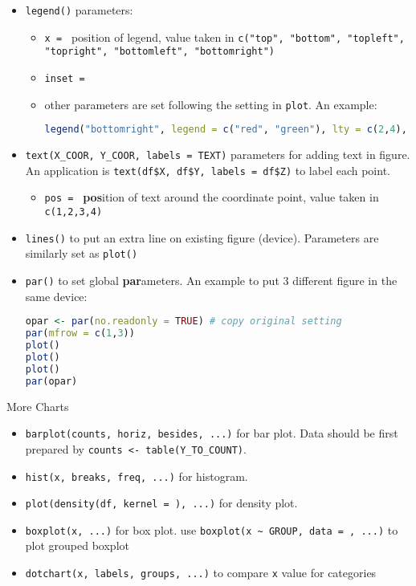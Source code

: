 \begin{itemize}[topsep=2pt,itemsep=0pt]
        

    \item \lstinline|legend()| parameters:
    \begin{itemize}[topsep=2pt,itemsep=0pt]
        \item \lstinline|x = | position of legend, value taken in \lstinline|c("top", "bottom", "topleft", "topright", "bottomleft", "bottomright")|
        \item \lstinline|inset = |
        \item other parameters are set following the setting in \lstinline|plot|. An example:
\begin{lstlisting}[language=R]
legend("bottomright", legend = c("red", "green"), lty = c(2,4), lwd = 3, col = c("red", "green"))
\end{lstlisting}

    \end{itemize}

    \item \lstinline|text(X_COOR, Y_COOR, labels = TEXT)| parameters for adding text in figure. An application is \lstinline|text(df$X, df$Y, labels = df$Z)| to label each point.
    \begin{itemize}[topsep=2pt,itemsep=0pt]
        \item \lstinline|pos = | \textbf{pos}ition of text around the coordinate point, value taken in \lstinline|c(1,2,3,4)| 
    \end{itemize}
    
    \item \lstinline|lines()| to put an extra line on existing figure (device). Parameters are similarly set as \lstinline|plot()|
    
    \item \lstinline|par()| to set global \textbf{par}ameters. An example to put 3 different figure in the same device:
\begin{lstlisting}[language=R]
opar <- par(no.readonly = TRUE) # copy original setting
par(mfrow = c(1,3))
plot()
plot()
plot()
par(opar)
\end{lstlisting}

\end{itemize}

\begin{point}
    More Charts
\end{point}

\begin{itemize}[topsep=2pt,itemsep=0pt]
    \item \lstinline|barplot(counts, horiz, besides, ...)| for bar plot. Data should be first prepared by \lstinline|counts <- table(Y_TO_COUNT)|. 
    \item \lstinline|hist(x, breaks, freq, ...)| for histogram.
    \item \lstinline|plot(density(df, kernel = ), ...)| for density plot.
    \item \lstinline|boxplot(x, ...)| for box plot. use \lstinline|boxplot(x ~ GROUP, data = , ...)| to plot grouped boxplot
    \item \lstinline|dotchart(x, labels, groups, ...)| to compare \lstinline|x| value for categories
\end{itemize}


